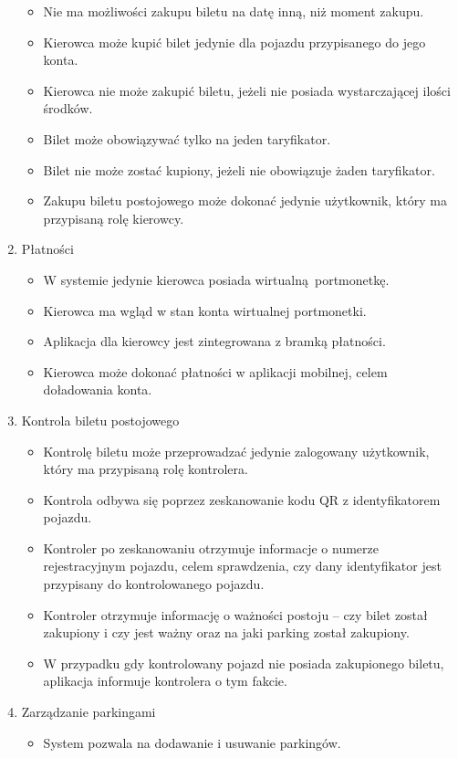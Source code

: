 \begin{enumerate}
\begin{itemize}
			\item Nie ma możliwości zakupu biletu na datę inną, niż moment zakupu.
			\item Kierowca może kupić bilet jedynie dla pojazdu przypisanego do jego konta.
			\item Kierowca nie może zakupić biletu, jeżeli nie posiada wystarczającej ilości środków.
			\item Bilet może obowiązywać tylko na jeden taryfikator.
			\item Bilet nie może zostać kupiony, jeżeli nie obowiązuje żaden taryfikator.
			\item Zakupu biletu postojowego może dokonać jedynie użytkownik, który ma przypisaną rolę kierowcy.
		\end{itemize}
	\item Płatności
		\begin{itemize}
			\item W systemie jedynie kierowca posiada wirtualną portmonetkę.
			\item Kierowca ma wgląd w stan konta wirtualnej portmonetki.
			\item Aplikacja dla kierowcy jest zintegrowana z bramką płatności.
			\item Kierowca może dokonać płatności w aplikacji mobilnej, celem doładowania konta.
		\end{itemize}
	\item Kontrola biletu postojowego
		\begin{itemize}
			\item Kontrolę biletu może przeprowadzać jedynie zalogowany użytkownik, który ma przypisaną rolę kontrolera.
			\item Kontrola odbywa się poprzez zeskanowanie kodu QR z identyfikatorem pojazdu.
			\item Kontroler po zeskanowaniu otrzymuje informacje o numerze rejestracyjnym pojazdu, celem sprawdzenia, czy dany identyfikator jest przypisany do kontrolowanego pojazdu.
			\item Kontroler otrzymuje informację o ważności postoju -- czy bilet został zakupiony i czy jest ważny oraz na jaki parking został zakupiony.
			\item W przypadku gdy kontrolowany pojazd nie posiada zakupionego biletu, aplikacja informuje kontrolera o tym fakcie.
		\end{itemize}
	\item Zarządzanie parkingami
		\begin{itemize}
			\item System pozwala na dodawanie i usuwanie parkingów.

\end{itemize}
\end{enumerate}
